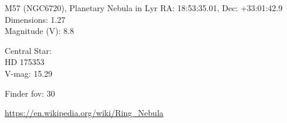 \begin{block}{M57 (NGC6720), Planetary Nebula in Lyr}
    RA: 18:53:35.01, Dec: +33:01:42.9 \\ 
    Dimensions: 1.27 \\ 
    Magnitude (V): 8.8

    Central Star: \\ 
      \hspace{1em}HD 175353 \\ 
      \hspace{1em}V-mag: 15.29 


    Finder fov: 30 

    \url{https://en.wikipedia.org/wiki/Ring_Nebula} 
\end{block}